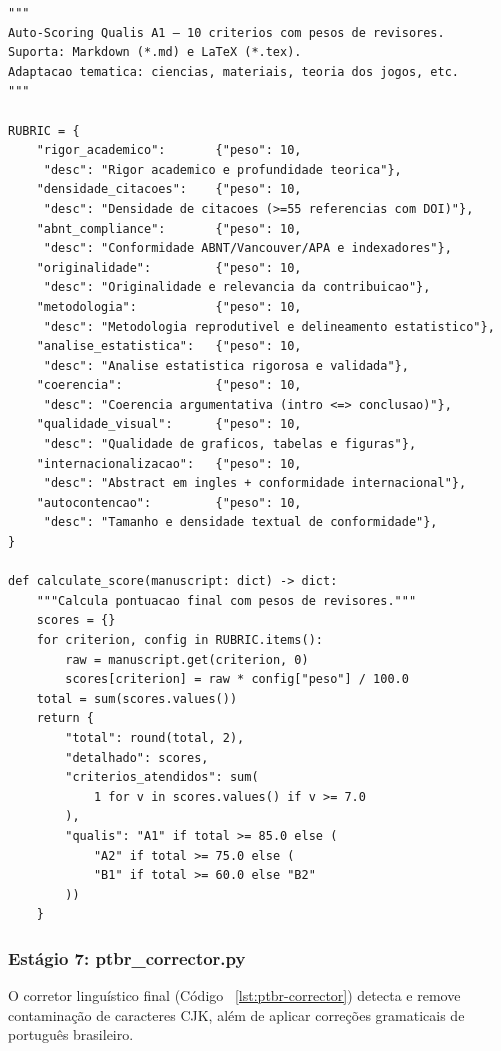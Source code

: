 \begin{lstlisting}[caption={auto\_score\_qualis.py — Rubrica de 10 criterios},
label={lst:auto-score}, style=pythonstyle]
"""
Auto-Scoring Qualis A1 — 10 criterios com pesos de revisores.
Suporta: Markdown (*.md) e LaTeX (*.tex).
Adaptacao tematica: ciencias, materiais, teoria dos jogos, etc.
"""

RUBRIC = {
    "rigor_academico":       {"peso": 10,
     "desc": "Rigor academico e profundidade teorica"},
    "densidade_citacoes":    {"peso": 10,
     "desc": "Densidade de citacoes (>=55 referencias com DOI)"},
    "abnt_compliance":       {"peso": 10,
     "desc": "Conformidade ABNT/Vancouver/APA e indexadores"},
    "originalidade":         {"peso": 10,
     "desc": "Originalidade e relevancia da contribuicao"},
    "metodologia":           {"peso": 10,
     "desc": "Metodologia reprodutivel e delineamento estatistico"},
    "analise_estatistica":   {"peso": 10,
     "desc": "Analise estatistica rigorosa e validada"},
    "coerencia":             {"peso": 10,
     "desc": "Coerencia argumentativa (intro <=> conclusao)"},
    "qualidade_visual":      {"peso": 10,
     "desc": "Qualidade de graficos, tabelas e figuras"},
    "internacionalizacao":   {"peso": 10,
     "desc": "Abstract em ingles + conformidade internacional"},
    "autocontencao":         {"peso": 10,
     "desc": "Tamanho e densidade textual de conformidade"},
}

def calculate_score(manuscript: dict) -> dict:
    """Calcula pontuacao final com pesos de revisores."""
    scores = {}
    for criterion, config in RUBRIC.items():
        raw = manuscript.get(criterion, 0)
        scores[criterion] = raw * config["peso"] / 100.0
    total = sum(scores.values())
    return {
        "total": round(total, 2),
        "detalhado": scores,
        "criterios_atendidos": sum(
            1 for v in scores.values() if v >= 7.0
        ),
        "qualis": "A1" if total >= 85.0 else (
            "A2" if total >= 75.0 else (
            "B1" if total >= 60.0 else "B2"
        ))
    }
\end{lstlisting}

\subsubsection{Estágio 7: ptbr\_corrector.py}

O corretor linguístico final (Código~ \ref{lst:ptbr-corrector})
detecta e remove contaminação de caracteres CJK, além de aplicar
correções gramaticais de português brasileiro.


